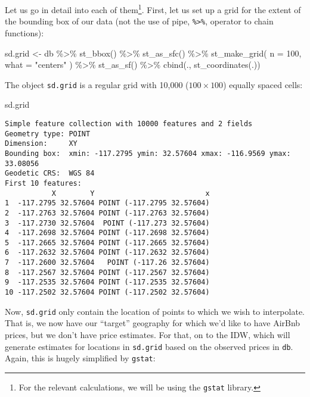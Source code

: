 \documentclass[
  letterpaper,
  krantz2]{style/krantz}
\newenvironment{Shaded}{\begin{snugshade}}{\end{snugshade}}
\newcommand{\AttributeTok}[1]{\textcolor[rgb]{0.40,0.45,0.13}{#1}}
\newcommand{\DecValTok}[1]{\textcolor[rgb]{0.68,0.00,0.00}{#1}}
\newcommand{\FunctionTok}[1]{\textcolor[rgb]{0.28,0.35,0.67}{#1}}
\newcommand{\NormalTok}[1]{\textcolor[rgb]{0.00,0.23,0.31}{#1}}
\newcommand{\OtherTok}[1]{\textcolor[rgb]{0.00,0.23,0.31}{#1}}
\newcommand{\SpecialCharTok}[1]{\textcolor[rgb]{0.37,0.37,0.37}{#1}}
\newcommand{\StringTok}[1]{\textcolor[rgb]{0.13,0.47,0.30}{#1}}
\begin{document}
Let us go in detail into each of them\footnote{For the relevant
  calculations, we will be using the \texttt{gstat} library.}. First,
let us set up a grid for the extent of the bounding box of our data (not
the use of pipe, \texttt{\%\textgreater{}\%}, operator to chain
functions):

\begin{Shaded}
\begin{Highlighting}[]
\NormalTok{sd.grid }\OtherTok{\textless{}{-}}\NormalTok{ db }\SpecialCharTok{\%\textgreater{}\%}
  \FunctionTok{st\_bbox}\NormalTok{() }\SpecialCharTok{\%\textgreater{}\%}
  \FunctionTok{st\_as\_sfc}\NormalTok{() }\SpecialCharTok{\%\textgreater{}\%}
  \FunctionTok{st\_make\_grid}\NormalTok{(}
    \AttributeTok{n =} \DecValTok{100}\NormalTok{,}
    \AttributeTok{what =} \StringTok{"centers"}
\NormalTok{  ) }\SpecialCharTok{\%\textgreater{}\%}
  \FunctionTok{st\_as\_sf}\NormalTok{() }\SpecialCharTok{\%\textgreater{}\%}
  \FunctionTok{cbind}\NormalTok{(., }\FunctionTok{st\_coordinates}\NormalTok{(.))}
\end{Highlighting}
\end{Shaded}

The object \texttt{sd.grid} is a regular grid with 10,000
(\(100 \times 100\)) equally spaced cells:

\begin{Shaded}
\begin{Highlighting}[]
\NormalTok{sd.grid}
\end{Highlighting}
\end{Shaded}

\begin{verbatim}
Simple feature collection with 10000 features and 2 fields
Geometry type: POINT
Dimension:     XY
Bounding box:  xmin: -117.2795 ymin: 32.57604 xmax: -116.9569 ymax: 33.08056
Geodetic CRS:  WGS 84
First 10 features:
           X        Y                          x
1  -117.2795 32.57604 POINT (-117.2795 32.57604)
2  -117.2763 32.57604 POINT (-117.2763 32.57604)
3  -117.2730 32.57604  POINT (-117.273 32.57604)
4  -117.2698 32.57604 POINT (-117.2698 32.57604)
5  -117.2665 32.57604 POINT (-117.2665 32.57604)
6  -117.2632 32.57604 POINT (-117.2632 32.57604)
7  -117.2600 32.57604   POINT (-117.26 32.57604)
8  -117.2567 32.57604 POINT (-117.2567 32.57604)
9  -117.2535 32.57604 POINT (-117.2535 32.57604)
10 -117.2502 32.57604 POINT (-117.2502 32.57604)
\end{verbatim}

Now, \texttt{sd.grid} only contain the location of points to which we
wish to interpolate. That is, we now have our ``target'' geography for
which we'd like to have AirBnb prices, but we don't have price
estimates. For that, on to the IDW, which will generate estimates for
locations in \texttt{sd.grid} based on the observed prices in
\texttt{db}. Again, this is hugely simplified by \texttt{gstat}:
\end{document}
